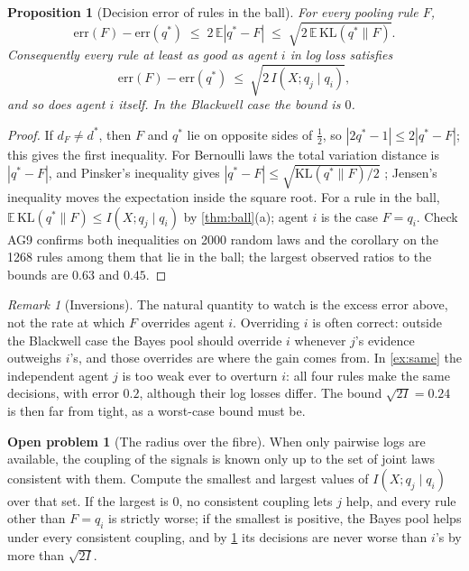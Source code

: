 \documentclass[11pt]{article}
\newtheorem{proposition}[theorem]{Proposition}
\theoremstyle{definition}
\newtheorem{problem}[theorem]{Open problem}
\theoremstyle{remark}
\newtheorem{remark}[theorem]{Remark}
\newcommand{\EE}{\mathbb E}
\newcommand{\KL}{\mathrm{KL}}
\begin{document}
\begin{proposition}[Decision error of rules in the ball]\label{prop:decision}
For every pooling rule $F$,
\[
\mathrm{err}(F)-\mathrm{err}(q^*)\;\le\;2\,\EE|q^*-F|\;\le\;\sqrt{2\,\EE\,\KL(q^*\|F)}.
\]
Consequently every rule at least as good as agent $i$ in log loss satisfies
\[
\mathrm{err}(F)-\mathrm{err}(q^*)\ \le\ \sqrt{2\,I(X;q_j\mid q_i)},
\]
and so does agent $i$ itself. In the Blackwell case the bound is $0$.
\end{proposition}
\begin{proof}
If $d_F\ne d^*$, then $F$ and $q^*$ lie on opposite sides of $\tfrac12$, so $|2q^*-1|\le2|q^*-F|$; this gives the first inequality. For
Bernoulli laws the total variation distance is $|q^*-F|$, and Pinsker's inequality gives $|q^*-F|\le\sqrt{\KL(q^*\|F)/2}$
\cite{CoverThomas2006}; Jensen's inequality moves the expectation inside the square root. For a rule in the ball,
$\EE\,\KL(q^*\|F)\le I(X;q_j\mid q_i)$ by \cref{thm:ball}(a); agent $i$ is the case $F=q_i$. Check AG9 confirms both inequalities on 2000
random laws and the corollary on the 1268 rules among them that lie in the ball; the largest observed ratios to the bounds are $0.63$ and
$0.45$.
\end{proof}

\begin{remark}[Inversions]
The natural quantity to watch is the excess error above, not the rate at which $F$ overrides agent $i$. Overriding $i$ is often correct:
outside the Blackwell case the Bayes pool should override $i$ whenever $j$'s evidence outweighs $i$'s, and those overrides are where the
gain comes from. In \cref{ex:same} the independent agent $j$ is too weak ever to overturn $i$: all four rules make the same decisions,
with error $0.2$, although their log losses differ. The bound $\sqrt{2I}=0.24$ is then far from tight, as a worst-case bound must be.
\end{remark}

\begin{problem}[The radius over the fibre]\label{op:radius}
When only pairwise logs are available, the coupling of the signals is known only up to the set of joint laws consistent with them. Compute
the smallest and largest values of $I(X;q_j\mid q_i)$ over that set. If the largest is $0$, no consistent coupling lets $j$ help, and
every rule other than $F=q_i$ is strictly worse; if the smallest is positive, the Bayes pool helps under every consistent coupling, and by
\cref{prop:decision} its decisions are never worse than $i$'s by more than $\sqrt{2I}$.
\end{problem}
\end{document}
